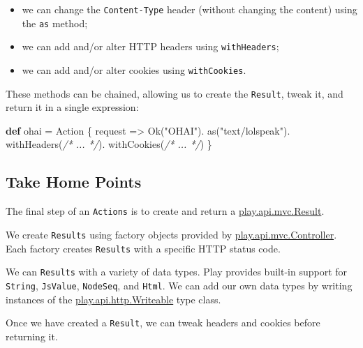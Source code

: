 \documentclass[oneside,11pt,a4paper,]{book}
\newenvironment{Shaded}{\begin{snugshade}}{\end{snugshade}}
\newcommand{\KeywordTok}[1]{\textcolor[rgb]{0.13,0.29,0.53}{\textbf{{#1}}}}
\newcommand{\StringTok}[1]{\textcolor[rgb]{0.31,0.60,0.02}{{#1}}}
\newcommand{\CommentTok}[1]{\textcolor[rgb]{0.56,0.35,0.01}{\textit{{#1}}}}
\newcommand{\FunctionTok}[1]{\textcolor[rgb]{0.00,0.00,0.00}{{#1}}}
\newcommand{\NormalTok}[1]{{#1}}
\begin{document}
\begin{itemize}
\itemsep1pt\parskip0pt
\item
  we can change the \texttt{Content-Type} header (without changing the
  content) using the \texttt{as} method;
\item
  we can add and/or alter HTTP headers using \texttt{withHeaders};
\item
  we can add and/or alter cookies using \texttt{withCookies}.
\end{itemize}

These methods can be chained, allowing us to create the \texttt{Result},
tweak it, and return it in a single expression:

\begin{Shaded}
\begin{Highlighting}[]
\KeywordTok{def} \NormalTok{ohai = Action \{ request =>}
  \FunctionTok{Ok}\NormalTok{(}\StringTok{"OHAI"}\NormalTok{).}
    \FunctionTok{as}\NormalTok{(}\StringTok{"text/lolspeak"}\NormalTok{).}
    \FunctionTok{withHeaders}\NormalTok{(}\CommentTok{/* ... */}\NormalTok{).}
    \FunctionTok{withCookies}\NormalTok{(}\CommentTok{/* ... */}\NormalTok{)}
\NormalTok{\}}
\end{Highlighting}
\end{Shaded}

\subsection{Take Home Points}\label{take-home-points-3}

The final step of an \texttt{Actions} is to create and return a
\href{https://www.playframework.com/documentation/2.3.x/api/scala/index.html\#play.api.mvc.Result}{play.api.mvc.Result}.

We create \texttt{Results} using factory objects provided by
\href{https://www.playframework.com/documentation/2.3.x/api/scala/index.html\#play.api.mvc.Controller}{play.api.mvc.Controller}.
Each factory creates \texttt{Results} with a specific HTTP status code.

We can \texttt{Results} with a variety of data types. Play provides
built-in support for \texttt{String}, \texttt{JsValue},
\texttt{NodeSeq}, and \texttt{Html}. We can add our own data types by
writing instances of the
\href{https://www.playframework.com/documentation/2.3.x/api/scala/index.html\#play.api.http.Writeable}{play.api.http.Writeable}
type class.

Once we have created a \texttt{Result}, we can tweak headers and cookies
before returning it.
\end{document}
